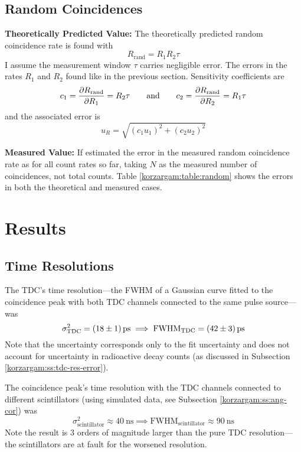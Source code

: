 \documentclass[11pt, a4paper]{article}
\newcommand{\eqtext}[1]{\qquad \text{#1} \qquad}
\newcommand{\fwhm}{\mathrm{FWHM}}
\begin{document}
\subsection{Random Coincidences}
\textbf{Theoretically Predicted Value:} The theoretically predicted random coincidence rate is found with
\begin{equation*}
	R_{\text{rand}} = R_{1}R_{2}\tau
\end{equation*}
I assume the measurement window $ \tau $ carries negligible error. The errors in the rates $ R_{1} $ and $ R_{2} $ found like in the previous section. Sensitivity coefficients are
\begin{equation*}
	c_{1} = \pdv{R_{\text{rand}}}{R_{1}} = R_{2}\tau \eqtext{and} c_{2} = \pdv{R_{\text{rand}}}{R_{2}} = R_{1}\tau
\end{equation*}
and the associated error is
\begin{equation*}
	u_{R} = \sqrt{(c_{1}u_{1})^{2} + (c_{2}u_{2})^{2}} 
\end{equation*}

\vspace{2mm}
\textbf{Measured Value:} If estimated the error in the measured random coincidence rate as for all count rates so far, taking $ N $ as the measured number of coincidences, not total counts. Table \ref{korzargam:table:random} shows the errors in both the theoretical and measured cases.

\section{Results}
\subsection{Time Resolutions}
The TDC's time resolution---the FWHM of a Gaussian curve fitted to the coincidence peak with both TDC channels connected to the same pulse source---was
\begin{equation*}
	\sigma^{2}_{\text{TDC}} = \SI{18\pm 1}{\pico \second}  \implies 	\fwhm_{\text{TDC}} = \SI{42\pm 3}{\pico \second}
\end{equation*}
Note that the uncertainty corresponds only to the fit uncertainty and does not account for uncertainty in radioactive decay counts (as discussed in Subsection \ref{korzargam:ss:tdc-res-error}). 

The coincidence peak's time resolution with the TDC channels connected to different scintillators (using simulated data, see Subsection \ref{korzargam:ss:ang-cor}) was
\begin{equation*}
	\sigma^{2}_{\text{scintillator}} \approx \SI{40}{\nano \second} \implies \fwhm_{\text{scintillator}} \approx \SI{90}{\nano \second}
\end{equation*}
Note the result is 3 orders of magnitude larger than the pure TDC resolution---the scintillators are at fault for the worsened resolution.
\end{document}
